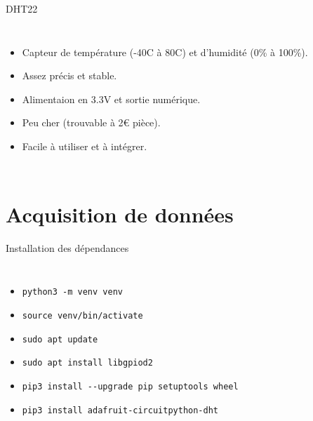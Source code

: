 \documentclass[aspectratio=169,xcolor=dvipsnames]{beamer}
\begin{document}
\begin{frame}{DHT22}
    \begin{columns}[c] %

        \begin{itemize}
            \item Capteur de température (-40C à 80C) et d'humidité (0\% à 100\%).
            \item Assez précis et stable.
            \item Alimentaion en 3.3V et sortie numérique.
            \item Peu cher (trouvable à 2€ pièce).
            \item Facile à utiliser et à intégrer.
        \end{itemize}

    \end{columns}
\end{frame}


\section{Acquisition de données}

\begin{frame}{Installation des dépendances}
    \begin{columns}[c] %

        \begin{itemize}
            \item \texttt{python3 -m venv venv}
            \item \texttt{source venv/bin/activate}
            \item \texttt{sudo apt update}
            \item \texttt{sudo apt install libgpiod2}
            \item \texttt{pip3 install -{}-upgrade pip setuptools wheel}
            \item \texttt{pip3 install adafruit-circuitpython-dht}
        \end{itemize}

    \end{columns}
\end{frame}
\end{document}
